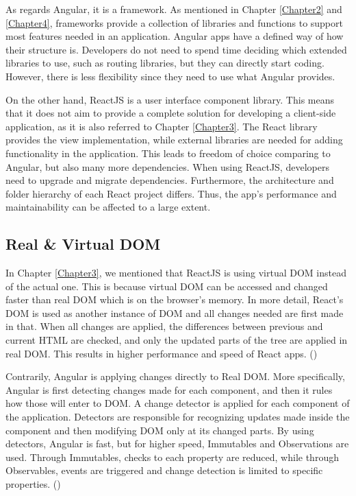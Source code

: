 As regards Angular, it is a framework. As mentioned in Chapter \ref{Chapter2} and \ref{Chapter4}, frameworks provide a collection of libraries and functions to support most features needed in an application. Angular apps have a defined way of how their structure is. Developers do not need to spend time deciding which extended libraries to use, such as routing libraries, but they can directly start coding. However, there is less flexibility since they need to use what Angular provides. \par

On the other hand, ReactJS is a user interface component library. This means that it does not aim to provide a complete solution for developing a client-side application, as it is also referred to Chapter \ref{Chapter3}. The React library provides the view implementation, while external libraries are needed for adding functionality in the application. This leads to freedom of choice comparing to Angular, but also many more dependencies. When using ReactJS, developers need to upgrade and migrate dependencies. Furthermore, the architecture and folder hierarchy of each React project differs. Thus, the app's performance and maintainability can be affected to a large extent. \par

\subsection{Real \& Virtual DOM}

In Chapter \ref{Chapter3}, we mentioned that ReactJS is using virtual DOM instead of the actual one. This is because virtual DOM can be accessed and changed faster than real DOM which is on the browser's memory. In more detail, React's DOM is used as another instance of DOM and all changes needed are first made in that. When all changes are applied, the differences between previous and current HTML are checked, and only the updated parts of the tree are applied in real DOM. This results in higher performance and speed of React apps. (\cite{Reference6}) \par

Contrarily, Angular is applying changes directly to Real DOM. More specifically, Angular is first detecting changes made for each component, and then it rules how those will enter to DOM. A change detector is applied for each component of the application. Detectors are responsible for recognizing updates made inside the component and then modifying DOM only at its changed parts. By using detectors, Angular is fast, but for higher speed, Immutables and Observations are used. Through Immutables, checks to each property are reduced, while through Observables, events are triggered and change detection is limited to specific properties. (\cite{Reference6}) \par

